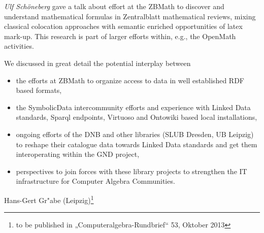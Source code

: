 \documentclass{article}
\begin{document}
\emph{Ulf Schöneberg} gave a talk about effort at the ZBMath to discover and
understand mathematical formulas in Zentralblatt mathematical reviews, mixing
classical colocation approaches with semantic enriched opportunities of latex
mark-up. This research is part of larger efforts within, e.g., the OpenMath
activities.

We discussed in great detail the potential interplay between
\begin{itemize}
\item the efforts at ZBMath to organize access to data in well established RDF
  based formats,
\item the SymbolicData intercommunity efforts and experience with Linked Data
  standards, Sparql endpoints, Virtuoso and Ontowiki based local
  installations,
\item ongoing efforts of the DNB and other libraries (SLUB Dresden, UB
  Leipzig) to reshape their catalogue data towards Linked Data standards and
  get them interoperating within the GND project,
\item perspectives to join forces with these library projects to strengthen
  the IT infrastructure for Computer Algebra Communities.
\end{itemize}
\begin{flushright}
    Hans-Gert Gr"abe (Leipzig)\footnote{to be published in
      „Computeralgebra-Rundbrief“ 53, Oktober 2013}
  \end{flushright}
\end{document}
